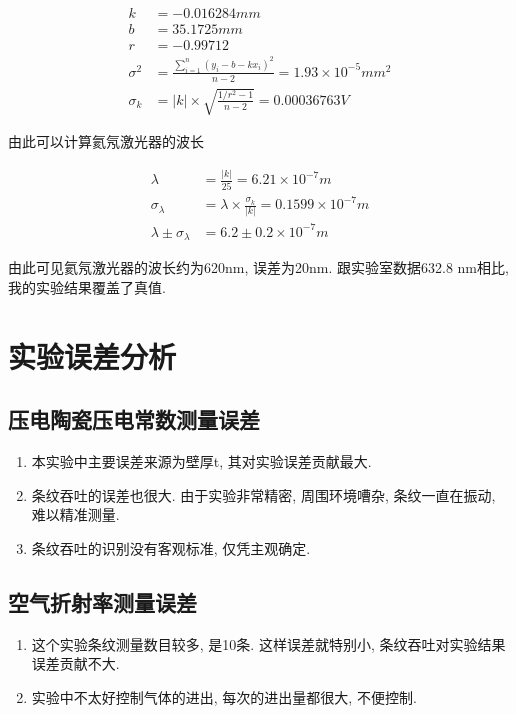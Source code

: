 \documentclass[a4paper,10pt,notitlepage]{article}
\begin{document}
\begin{align*}
	k &= -0.016284 mm \\
	b &= 35.1725 mm \\
	r &= -0.99712 \\
	\sigma^2 &= \frac{\sum_{i = 1}^{n}(y_i - b - kx_i)^2}{n - 2} = 1.93 \times 10^{-5} mm^2 \\
	\sigma_k &= |k| \times \sqrt{\frac{1/r^2 - 1}{n - 2}} = 0.00036763V 
\end{align*}

	由此可以计算氦氖激光器的波长
	
\begin{align*}
	\lambda &= \frac{|k|}{25} = 6.21 \times 10^{-7} m \\
	\sigma_{\lambda} &= \lambda \times \frac{\sigma_k}{|k|} = 0.1599 \times 10^{-7} m \\
	\lambda \pm \sigma_{\lambda} &= 6.2 \pm 0.2 \times 10^{-7} m
\end{align*}

	由此可见氦氖激光器的波长约为620nm, 误差为20nm. 跟实验室数据632.8 nm相比, 我的实验结果覆盖了真值.

\section{实验误差分析}

\subsection{压电陶瓷压电常数测量误差}

\begin{enumerate}
	\item 本实验中主要误差来源为壁厚t, 其对实验误差贡献最大.
	\item 条纹吞吐的误差也很大. 由于实验非常精密, 周围环境嘈杂, 条纹一直在振动, 难以精准测量.
	\item 条纹吞吐的识别没有客观标准, 仅凭主观确定.
\end{enumerate}

\subsection{空气折射率测量误差}

\begin{enumerate}
	\item 这个实验条纹测量数目较多, 是10条. 这样误差就特别小, 条纹吞吐对实验结果误差贡献不大.
	\item 实验中不太好控制气体的进出, 每次的进出量都很大, 不便控制.
\end{enumerate}
\end{document}
